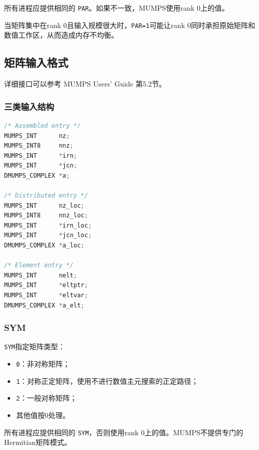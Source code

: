 所有进程应提供相同的 \texttt{PAR}。如果不一致，MUMPS使用rank 0上的值。

当矩阵集中在rank 0且输入规模很大时，\texttt{PAR=1}可能让rank 0同时承担原始矩阵和数值工作区，从而造成内存不均衡。

\subsection{矩阵输入格式}

详细接口可以参考 MUMPS Users' Guide 第5.2节。

\subsubsection{三类输入结构}

\begin{lstlisting}[language=C]
/* Assembled entry */
MUMPS_INT      nz;
MUMPS_INT8     nnz;
MUMPS_INT      *irn;
MUMPS_INT      *jcn;
DMUMPS_COMPLEX *a;

/* Distributed entry */
MUMPS_INT      nz_loc;
MUMPS_INT8     nnz_loc;
MUMPS_INT      *irn_loc;
MUMPS_INT      *jcn_loc;
DMUMPS_COMPLEX *a_loc;

/* Element entry */
MUMPS_INT      nelt;
MUMPS_INT      *eltptr;
MUMPS_INT      *eltvar;
DMUMPS_COMPLEX *a_elt;
\end{lstlisting}

\subsubsection{SYM}

\texttt{SYM}指定矩阵类型：

\begin{itemize}
  \item \texttt{0}：非对称矩阵；
  \item \texttt{1}：对称正定矩阵，使用不进行数值主元搜索的正定路径；
  \item \texttt{2}：一般对称矩阵；
  \item 其他值按0处理。
\end{itemize}

所有进程应提供相同的 \texttt{SYM}，否则使用rank 0上的值。MUMPS不提供专门的Hermitian矩阵模式。
